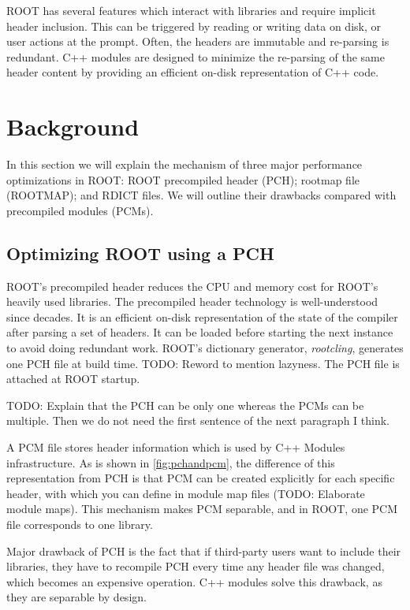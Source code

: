 \documentclass{webofc}
\begin{document}
ROOT has several features which interact with libraries and require implicit header inclusion. This can be triggered by reading or writing data on disk, or user actions at the prompt. Often, the headers are immutable and re-parsing is redundant. C++ modules are designed to minimize the re-parsing of the same header content by providing an efficient on-disk representation of C++ code.

\section{Background}
\label{background}

In this section we will explain the mechanism of three major performance optimizations in ROOT: ROOT precompiled header (PCH); rootmap file (ROOTMAP); and RDICT files. We will outline their drawbacks compared with precompiled modules (PCMs).

\subsection{Optimizing ROOT using a PCH}
\label{pch}

ROOT's precompiled header reduces the CPU and memory cost for ROOT’s heavily used libraries. The precompiled header technology is well-understood since decades. It is an efficient on-disk representation of the state of the compiler after parsing a set of headers. It can be loaded before starting the next instance to avoid doing redundant work. ROOT’s dictionary generator, \textit{rootcling}, generates one PCH file at build time. TODO: Reword to mention lazyness. The PCH file is attached at ROOT startup.

TODO: Explain that the PCH can be only one whereas the PCMs can be multiple. Then we do not need the first sentence of the next paragraph I think.

A PCM file stores header information which is used by C++ Modules infrastructure. As is shown in \ref{fig:pchandpcm}, the difference of this representation from PCH is that PCM can be created explicitly for each specific header, with which you can define in module map files (TODO: Elaborate module maps). This mechanism makes PCM separable, and in ROOT, one PCM file corresponds to one library.

Major drawback of PCH is the fact that if third-party users want to include their libraries, they have to recompile PCH every time any header file was changed, which becomes an expensive operation. C++ modules solve this drawback, as they are separable by design.
\end{document}
